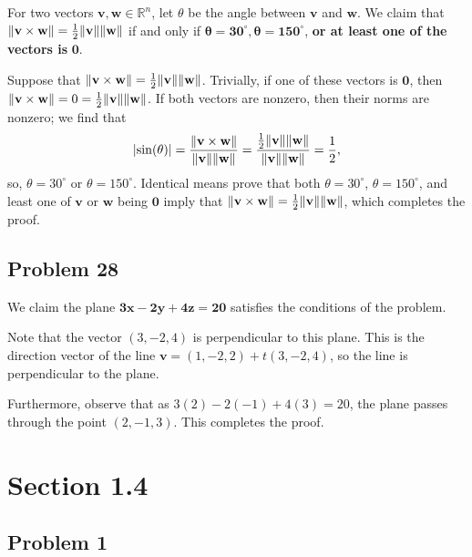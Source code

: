 \documentclass[11pt]{article}
\renewcommand{\vec}[1]{\mathbf{#1}}
\begin{document}
For two vectors $\vec{v}, \vec{w} \in \mathbb{R}^{n}$, let $\theta$ be the angle between $\vec{v}$ and $\vec{w}$. We claim that $\norm{\vec{v} \times \vec{w}} = \tfrac{1}{2}\norm{\vec{v}}\norm{\vec{w}}$ if and only if $\mathbf{\theta = 30^{\circ}, \theta = 150^{\circ}}$, \textbf{or at least one of the vectors is} $\mathbf{\vec{0}}$.

Suppose that $\norm{\vec{v} \times \vec{w}} = \tfrac{1}{2} \norm{\vec{v}}\norm{\vec{w}}$. Trivially, if one of these vectors is $\vec{0}$, then $\norm{\vec{v} \times \vec{w}} = 0 = \tfrac{1}{2}\norm{\vec{v}}\norm{\vec{w}}$. If both vectors are nonzero, then their norms are nonzero; we find that  
\[ 
	\abs{\sin(\theta)} = \frac{\norm{\vec{v} \times \vec{w}}}{\norm{\vec{v}}\norm{\vec{w}}} = \frac{\tfrac{1}{2}\norm{\vec{v}}\norm{\vec{w}}}{{\norm{\vec{v}}\norm{\vec{w}}}} = \frac{1}{2},
\]
so, $\theta = 30^{\circ}$ or $\theta = 150^{\circ}$. Identical means prove that both $\theta = 30^{\circ}$, $\theta = 150^{\circ}$, and least one of $\vec{v}$ or $\vec{w}$ being $\vec{0}$ imply that $\norm{\vec{v} \times \vec{w}} = \tfrac{1}{2}\norm{\vec{v}}\norm{\vec{w}}$, which completes the proof.

\subsection*{Problem 28}

We claim the plane $\mathbf{3x - 2y + 4z = 20}$ satisfies the conditions of the problem.

Note that the vector $(3, -2, 4)$ is perpendicular to this plane. This is the direction vector of the line $\vec{v} = (1, -2, 2) + t(3, -2, 4)$, so the line is perpendicular to the plane.

Furthermore, observe that as $3(2) - 2(-1) + 4(3) = 20$, the plane passes through the point $(2, -1, 3)$. This completes the proof.


\section{Section 1.4}

\subsection*{Problem 1}
\end{document}
